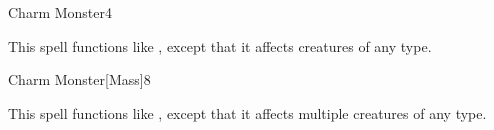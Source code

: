 \begin{spellsection}{Charm Monster}{4}
    \begin{spellheader}
    \end{spellheader}
    \begin{spellcontent}
        \begin{spelltargetinginfo}
        \end{spelltargetinginfo}
        \begin{spelleffects}
            \spellspecial This spell functions like , except that it affects creatures of any type.
        \end{spelleffects}
    \end{spellcontent}
    \begin{spellfooter}
        \miscastrandom
    \end{spellfooter}
\end{spellsection}

\begin{spellsection}{Charm Monster}[Mass]{8}
    \begin{spellheader}
    \end{spellheader}
    \begin{spellcontent}
        \begin{spelltargetinginfo}
        \end{spelltargetinginfo}
        \begin{spelleffects}
            \spellspecial This spell functions like , except that it affects multiple creatures of any type.
        \end{spelleffects}
    \end{spellcontent}
    \begin{spellfooter}
        \miscastyou
    \end{spellfooter}
\end{spellsection}

